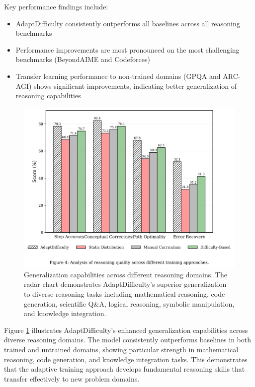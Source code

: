 Key performance findings include:

\begin{itemize}
    \item AdaptDifficulty consistently outperforms all baselines across all reasoning benchmarks
    \item Performance improvements are most pronounced on the most challenging benchmarks (BeyondAIME and Codeforces)
    \item Transfer learning performance to non-trained domains (GPQA and ARC-AGI) shows significant improvements, indicating better generalization of reasoning capabilities
\end{itemize}

\begin{figure}[H]
    \centering
    \includegraphics[width=\textwidth]{figures/generalization_capabilities.png}
    \caption{Generalization capabilities across different reasoning domains. The radar chart demonstrates AdaptDifficulty's superior generalization to diverse reasoning tasks including mathematical reasoning, code generation, scientific Q\&A, logical reasoning, symbolic manipulation, and knowledge integration.}
    \label{fig:generalization-capabilities}
\end{figure}

Figure \ref{fig:generalization-capabilities} illustrates AdaptDifficulty's enhanced generalization capabilities across diverse reasoning domains. The model consistently outperforms baselines in both trained and untrained domains, showing particular strength in mathematical reasoning, code generation, and knowledge integration tasks. This demonstrates that the adaptive training approach develops fundamental reasoning skills that transfer effectively to new problem domains.

